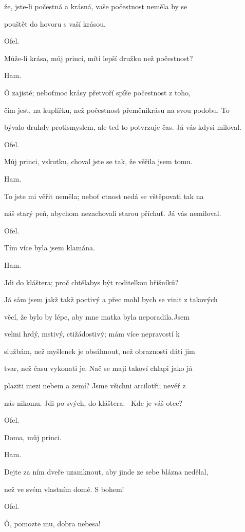 \documentclass[11pt]{article}
\begin{document}
\begin{multicols}{2}
    že, jste-li počestná a krásná, vaše počestnost neměla by se

    pouštět do hovoru s vaší krásou.

    Ofel.

    Může-li krása, můj princi, míti lepší družku než počestnost?

    Ham.

    Ó zajisté; neboťmoc krásy přetvoří spíše počestnost z toho,

    čím jest, na kuplířku, než počestnost přeměníkrásu na svou podobu. To

    bývalo druhdy protismyslem, ale teď to potvrzuje čas. Já vás kdysi miloval.

    Ofel.

    Můj princi, vskutku, choval jste se tak, že věřila jsem tomu.

    Ham.

    To jste mi věřit neměla; neboť ctnost nedá se vštěpovati tak na

    náš starý peň, abychom nezachovali starou příchuť. Já vás nemiloval.

    Ofel.

    Tím více byla jsem klamána.

    Ham.

    Jdi do kláštera; proč chtělabys být roditelkou hříšníků?

    Já sám jsem jakž takž poctivý a přec mohl bych se vinit z takových

    věcí, že bylo by lépe, aby mne matka byla neporadila.Jsem

    velmi hrdý, mstivý, ctižádostivý; mám více nepravostí k

    službám, než myšlenek je obsáhnout, než obraznosti dáti jim

    tvar, než času vykonati je. Nač se mají takoví chlapi jako já

    plaziti mezi nebem a zemí? Jsme všichni arcilotři; nevěř z

    nás nikomu. Jdi po svých, do kláštera. –Kde je váš otec?

    Ofel.

    Doma, můj princi.

    Ham.

    Dejte za ním dveře uzamknout, aby jinde ze sebe blázna nedělal,

    než ve svém vlastním domě. S bohem!

    Ofel.

    Ó, pomozte mu, dobra nebesa!


\end{multicols}
\end{document}
